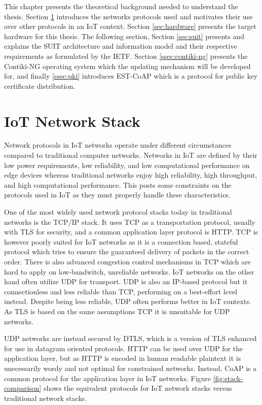 \documentclass[0-thesis.tex]{subfiles}
\begin{document}
This chapter presents the theoretical background needed to understand the thesis. Section
\ref{sec:network} introduces the networks protocols used and motivates their use over
other protocols in an IoT context. Section \ref{sec:hardware} presents the target hardware
for this thesis. The following section, Section \ref{sec:suit} presents and explains the
SUIT architecture and information model and their respective requirements as formulated by
the IETF. Section \ref{ssec:contiki-ng} presents the Contiki-NG operating system which the
updating mechanism will be developed for, and finally \ref{ssec:pki} introduces EST-CoAP
which is a protocol for public key certificate distribution. 

\section{IoT Network Stack}
\label{sec:network}
Network protocols in IoT networks operate under different circumstances compared to
traditional computer networks. Networks in IoT are defined by their low power
requirements, low reliability, and low computational performance on edge devices whereas
traditional networks enjoy high reliability, high throughput, and high computational
performance. This posts some constraints on the protocols used in IoT as they must
properly handle these characteristics.

One of the most widely used network protocol stacks today in traditional networks is the
TCP/IP stack. It uses TCP as a transportation protocol, usually with TLS for security, and
a common application layer protocol is HTTP. TCP is however poorly suited for IoT networks
as it is a connection based, stateful protocol which tries to ensure the guaranteed
delivery of packets in the correct order. There is also advanced congestion control
mechanisms in TCP which are hard to apply on low-bandwitch, unreliable networks. IoT
networks on the other hand often utilize UDP for transport. UDP is also an IP-based
protocol but it connectionless and less reliable than TCP, performing on a best-effort
level instead. Despite being less reliable, UDP often performs better in IoT contexts. As
TLS is based on the same assumptions TCP it is unsuitable for UDP networks. 

UDP networks are instead secured by DTLS, which is a version of TLS enhanced for use in
datagram oriented protocols. HTTP can be used over UDP for the application layer, but as
HTTP is encoded in human readable plaintext it is unecessarily wordy and not optimal for
constrained networks. Instead, CoAP is a common protocol for the application layer in IoT
networks. Figure \ref{fig:stack-comparison} shows the equivalent protocols for IoT network
stacks versus traditional network stacks. 
\end{document}
